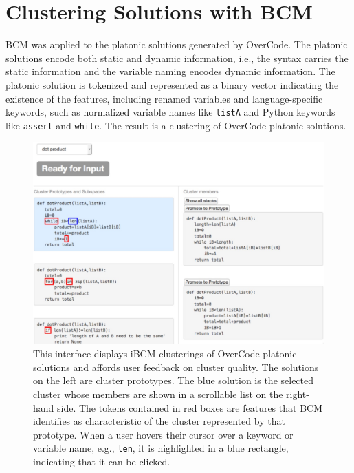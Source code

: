 

\section{Clustering Solutions with BCM}

BCM was applied to the platonic solutions generated by OverCode. The platonic solutions encode both static and dynamic information, i.e., the syntax carries the static information and the variable naming encodes dynamic information. The platonic solution is tokenized and represented as a binary vector indicating the existence of the features, including renamed variables and language-specific keywords, such as normalized variable names like \texttt{listA} and Python keywords like \texttt{assert} and \texttt{while}. The result is a clustering of OverCode platonic solutions. 

\begin{figure}[ht]
\includegraphics[width=0.75\columnwidth]{Body/figures/grovercode/overcode_ibcm}
\caption{This interface displays iBCM clusterings of OverCode platonic solutions and affords user feedback on cluster quality. The solutions on the left are cluster prototypes. The blue solution is the selected cluster whose members are shown in a scrollable list on the right-hand side. The tokens contained in red boxes are features that BCM identifies as characteristic of the cluster represented by that prototype. When a user hovers their cursor over a keyword or variable name, e.g., \texttt{len}, it is highlighted in a blue rectangle, indicating that it can be clicked.}
\label{overcode_ibcm}
\end{figure}

